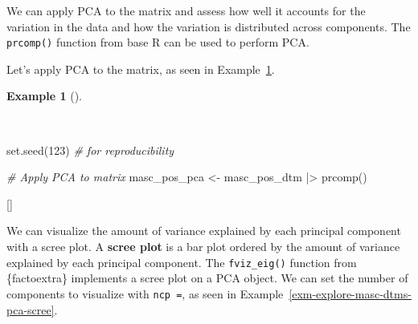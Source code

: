 \documentclass[
  letterpaper,
  krantz1]{latex/krantz-mod}
\newenvironment{Shaded}{\begin{snugshade}}{\end{snugshade}}
\newcommand{\CommentTok}[1]{\textcolor[rgb]{0.00,0.00,0.00}{\textit{#1}}}
\newcommand{\DecValTok}[1]{\textcolor[rgb]{0.00,0.00,0.00}{#1}}
\newcommand{\FunctionTok}[1]{\textcolor[rgb]{0.00,0.00,0.00}{#1}}
\newcommand{\NormalTok}[1]{\textcolor[rgb]{0.00,0.00,0.00}{#1}}
\newcommand{\OtherTok}[1]{\textcolor[rgb]{0.00,0.00,0.00}{#1}}
\newcommand{\SpecialCharTok}[1]{\textcolor[rgb]{0.00,0.00,0.00}{#1}}
\newcommand{\cindex}[1]{%
  \StrSubstitute{#1}{_}{\_}[\temp]%
  \index{\temp}%
}
\theoremstyle{definition}
\theoremstyle{definition}
\newtheorem{example}{Example}[chapter]
\theoremstyle{remark}
\begin{document}
We can apply PCA to the matrix and assess how well it accounts for the
variation in the data and how the variation is distributed across
components. The \texttt{prcomp()} function from base R can be used to
perform PCA.

Let's apply PCA to the matrix, as seen in
Example~\ref{exm-explore-masc-dtms-pca}.

\begin{example}[]\protect\hypertarget{exm-explore-masc-dtms-pca}{}\label{exm-explore-masc-dtms-pca}

~

\begin{Shaded}
\begin{Highlighting}[numbers=left,,]
\FunctionTok{set.seed}\NormalTok{(}\DecValTok{123}\NormalTok{) }\CommentTok{\# for reproducibility}

\CommentTok{\# Apply PCA to matrix}
\NormalTok{masc\_pos\_pca }\OtherTok{\textless{}{-}}
\NormalTok{  masc\_pos\_dtm }\SpecialCharTok{|\textgreater{}}
  \FunctionTok{prcomp}\NormalTok{()}
\end{Highlighting}
\end{Shaded}

\cindex{prcomp()}

\end{example}

We can visualize the amount of variance explained by each principal
component with a scree plot. A \textbf{scree plot} is
a bar plot ordered by the amount of variance explained
by each principal component. The \texttt{fviz\_eig()} function from
\{factoextra\} implements a scree plot on a PCA object. We can set the
number of components to visualize with \texttt{ncp\ =}, as seen in
Example~\ref{exm-explore-masc-dtms-pca-scree}.
\end{document}
